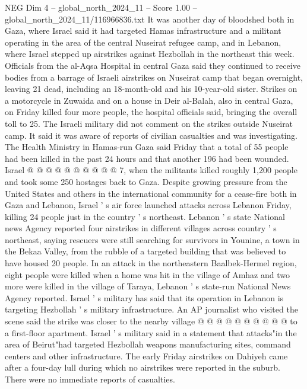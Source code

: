 \begin{textsample}{NEG Dim 4 – global\_north\_2024\_11 – Score 1.00 – global\_north\_2024\_11/116966836.txt}  \label{ex:f4_neg_176}
It was another day of bloodshed both in Gaza, where Israel said it had targeted Hamas infrastructure and a militant operating in the area of the central Nuseirat refugee camp, and in Lebanon, where Israel stepped up airstrikes against Hezbollah in the northeast this week.
Officials from the al-Aqsa Hospital in central Gaza said they continued to receive bodies from a barrage of Israeli airstrikes on Nuseirat camp that began overnight, leaving 21 dead, including an 18-month-old and his 10-year-old sister.
Strikes on a motorcycle in Zuwaida and on a house in Deir al-Balah, also in central Gaza, on Friday killed four more people, the hospital officials said, bringing the overall toll to 25.
The Israeli military did not comment on the strikes outside Nuseirat camp.
It said it was aware of reports of civilian casualties and was investigating.
The Health Ministry in Hamas-run Gaza said Friday that a total of 55 people had been killed in the past 24 hours and that another 196 had been wounded.
Israel @ @ @ @ @ @ @ @ @ @ 7, when the militants killed roughly 1,200 people and took some 250 hostages back to Gaza.
Despite growing pressure from the United States and others in the international community for a cease-fire both in Gaza and Lebanon, Israel ' s air force launched attacks across Lebanon Friday, killing 24 people just in the country ' s northeast.
Lebanon ' s state National news Agency reported four airstrikes in different villages across country ' s northeast, saying rescuers were still searching for survivors in Younine, a town in the Bekaa Valley, from the rubble of a targeted building that was believed to have housed 20 people.
In an attack in the northeastern Baalbek-Hermel region, eight people were killed when a home was hit in the village of Amhaz and two more were killed in the village of Taraya, Lebanon ' s state-run National News Agency reported.
Israel ' s military has said that its operation in Lebanon is targeting Hezbollah ' s military infrastructure.
An AP journalist who visited the scene said the strike was closer to the nearby village @ @ @ @ @ @ @ @ @ @ to a first-floor apartment.
Israel ' s military said in a statement that attacks"in the area of Beirut"had targeted Hezbollah weapons manufacturing sites, command centers and other infrastructure.
The early Friday airstrikes on Dahiyeh came after a four-day lull during which no airstrikes were reported in the suburb.
There were no immediate reports of casualties.

\end{textsample}
